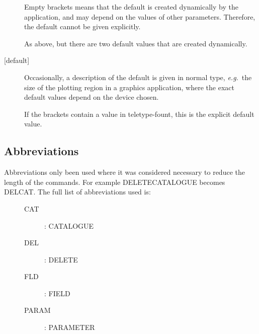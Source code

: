 \begin{description}

\item[{\mantt []}]
Empty brackets means that the default is created dynamically
by the application, and may depend on the values of other parameters.
Therefore, the default cannot be given explicitly.

\item[{\mantt [,]}]
As above, but there are two default values that are created dynamically.

\item[{\mantt [}{\rm default}{\mantt ]}]
Occasionally, a description of the default is given in normal type,
{\it e.g.}\ the size of the plotting region in a graphics application,
where the exact default values depend on the device chosen.

\item[{\mantt [default]}]
If the brackets contain a value in teletype-fount, this is the explicit
default value.

\end{description}

\subsection{Abbreviations}

Abbreviations  only been used where it was considered necessary to reduce
the length of the commands. For example  {\small DELETECATALOGUE} becomes
{\small DELCAT}. The full list of abbreviations used is:

\begin{description}
\item[\mbox{}]\mbox{}
\begin{description}
\item [CAT]: CATALOGUE
\item [DEL]: DELETE
\item [FLD]: FIELD
\item [PARAM]: PARAMETER
\end{description}
\end{description}





